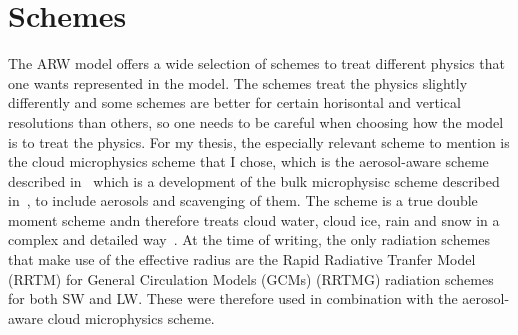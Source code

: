 \section{Schemes}
\label{sec:schemes}
The ARW model offers a wide selection of schemes to treat different physics that one wants represented in the model. The schemes treat the physics slightly differently and some schemes are better for certain horisontal and vertical resolutions than others, so one needs to be careful when choosing how the model is to treat the physics. For my thesis, the especially relevant scheme to mention is the cloud microphysics scheme that I chose, which is the aerosol-aware scheme described in~\cite{Thompson2014} which is a development of the bulk microphysisc scheme described in~\cite{Thompson2008}, to include aerosols and scavenging of them. The scheme is a true double moment scheme andn therefore treats cloud water, cloud ice, rain and snow in a complex and detailed way~\cite{Thompson2014}. At the time of writing, the only radiation schemes that make use of the effective radius are the Rapid Radiative Tranfer Model (RRTM) for General Circulation Models (GCMs) (RRTMG) radiation schemes~\cite{@authorsRRTMG} for both SW and LW. These were therefore used in combination with the aerosol-aware cloud microphysics scheme.

